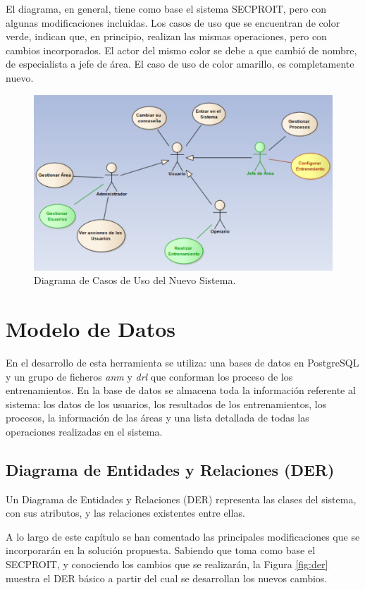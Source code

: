 El diagrama, en general, tiene como base el sistema SECPROIT, pero con algunas modificaciones incluidas. Los casos de uso que se encuentran de color verde, indican que, en principio, realizan las mismas operaciones, pero con cambios incorporados. El actor del mismo color se debe a que cambió de nombre, de especialista a jefe de área. El caso de uso de color amarillo, es completamente nuevo.

\begin{figure}[h]
\centering
 \includegraphics[width=0.6\linewidth]{imagen/casoUso.png}
 \caption{Diagrama de Casos de Uso del Nuevo Sistema.}
 \label{fig:casoUso} 
\end{figure}


\section{Modelo de Datos}
En el desarrollo de esta herramienta se utiliza: una bases de datos en PostgreSQL y un grupo de ficheros \textsl{anm} y \textsl{drl} que conforman los proceso de los entrenamientos. En la base de datos se almacena toda la información referente al sistema: los datos de los usuarios, los resultados de los entrenamientos, los procesos, la información de las áreas y una lista detallada de todas las operaciones realizadas en el sistema.

\subsection{Diagrama de Entidades y Relaciones (DER)}
Un Diagrama de Entidades y Relaciones (DER) representa las clases del sistema, con sus atributos, y las relaciones existentes entre ellas.

A lo largo de este capítulo se han comentado las principales modificaciones que se incorporarán en la solución propuesta. Sabiendo que toma como base el SECPROIT, y conociendo los cambios que se realizarán, la Figura \ref{fig:der} muestra el DER básico a partir del cual se desarrollan los nuevos cambios. 

